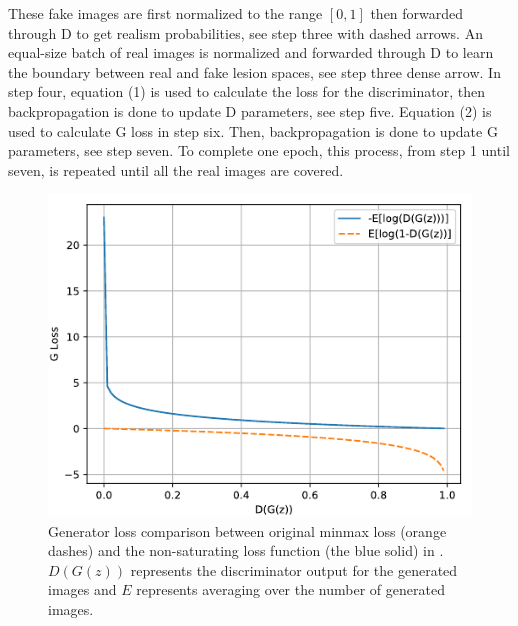 \documentclass[final,3p,twocolumn,authoryear,sort&compress,times]{maia}
\begin{document}
These fake images are first normalized to the range $[0,1]$ then forwarded through D to get realism probabilities, see step three with dashed arrows. An equal-size batch of real images is normalized and forwarded through D to learn the boundary between real and fake lesion spaces, see step three dense arrow. In step four, equation (1) is used to calculate the loss for the discriminator, then backpropagation is done to update D parameters, see step five. Equation (2) is used to calculate G loss in step six. Then, backpropagation is done to update G parameters, see step seven. To complete one epoch, this process, from step 1 until seven, is repeated until all the real images are covered. 

\begin{figure}[h]
	\centering
    \includegraphics{figures/G_loss.pdf}
    \caption{Generator loss comparison between original minmax loss (orange dashes) and the non-saturating loss function (the blue solid) in \citep{GAN}. $D(G(z))$ represents the discriminator output for the generated images and $E$ represents averaging over the number of generated images.}
    \label{fig:G_loss}
\end{figure}
\end{document}

